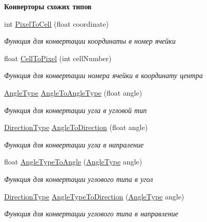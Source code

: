 \begin{Indent}\textbf{ Конверторы схожих типов}\par
\begin{DoxyCompactItemize}
\item 
int \hyperlink{namespacertm_a390df6b8bc4a01befd946155150db744}{Pixel\+To\+Cell} (float coordinate)
\begin{DoxyCompactList}\small\item\em Функция для конвертации координаты в номер ячейки \end{DoxyCompactList}\item 
float \hyperlink{namespacertm_af8d63f917ae1055a5766a0ba19542913}{Cell\+To\+Pixel} (int cell\+Number)
\begin{DoxyCompactList}\small\item\em Функция для конвертации номера ячейки в координату центра \end{DoxyCompactList}\item 
\hyperlink{namespacertm_a69dc82b16a0148c10962caa83d930f89}{Angle\+Type} \hyperlink{namespacertm_aea5ae6d368199e41611725e0db13c5c3}{Angle\+To\+Angle\+Type} (float angle)
\begin{DoxyCompactList}\small\item\em Функция для конвертации угла в угловой тип \end{DoxyCompactList}\item 
\hyperlink{namespacertm_a57b216f3aeb45041f3461bab08bc3aeb}{Direction\+Type} \hyperlink{namespacertm_ac81b2243a62081233f7b549248b5a145}{Angle\+To\+Direction} (float angle)
\begin{DoxyCompactList}\small\item\em Функция для конвертации угла в напраление \end{DoxyCompactList}\item 
float \hyperlink{namespacertm_ad13b014bcdda27e0ff2fb23f265e29e4}{Angle\+Type\+To\+Angle} (\hyperlink{namespacertm_a69dc82b16a0148c10962caa83d930f89}{Angle\+Type} angle)
\begin{DoxyCompactList}\small\item\em Функция для конвертации углового типа в угол \end{DoxyCompactList}\item 
\hyperlink{namespacertm_a57b216f3aeb45041f3461bab08bc3aeb}{Direction\+Type} \hyperlink{namespacertm_abeb9a79e27bc0c8c4c3e6cd9ec802627}{Angle\+Type\+To\+Direction} (\hyperlink{namespacertm_a69dc82b16a0148c10962caa83d930f89}{Angle\+Type} angle)
\begin{DoxyCompactList}\small\item\em Функция для конвертации углового типа в направление \end{DoxyCompactList}\item 

\end{DoxyCompactItemize}
\end{Indent}
